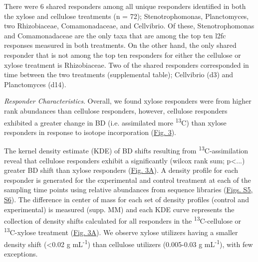 There were 6 shared responders among all unique responders identified in both the xylose and cellulose treatments (n = 72); Stenotrophomonas, Planctomyces, two Rhizobiaceae, Comamonadaceae, and Cellvibrio. Of these, Stenotrophomonas and Comamonadaceae are the only taxa that are among the top ten l2fc responses measured in both treatments. On the other hand, the only shared responder that is not among the top ten responders for either the cellulose or xylose treatment is Rhizobiaceae. Two of the shared responders corresponded in time between the two treatments (supplemental table); Cellvibrio (d3) and Planctomyces (d14).  

\textit{Responder Characteristics}.  Overall, we found xylose responders were from higher rank abundances than cellulose responders, however, cellulose responders exhibited a greater change in BD (i.e. assimilated more \textsuperscript{13}C) than xylose responders in response to isotope incorporation (\href{https://authorea.com/users/3537/articles/3612/master/file/figures/shift_and_rabund2/shift_and_rabund2.png}{Fig. 3}). 

The kernel density estimate (KDE) of BD shifts resulting from \textsuperscript{13}C-assimilation reveal that cellulose responders exhibit a significantly (wilcox rank sum; p\textless...) greater BD shift than xylose responders (\href{https://authorea.com/users/3537/articles/3612/master/file/figures/shift_and_rabund2/shift_and_rabund2.png}{Fig. 3A}). A density profile for each responder is generated for the experimental and control treatment at each of the sampling time points using relative abundances from sequence libraries (\href{https://authorea.com/users/3537/articles/8459/master/file/figures/xylose_resp_profiles/xylose_resp_profiles.png}{Figs. S5}\href{https://authorea.com/users/3537/articles/8459/master/file/figures/cellulose_resp_profiles/cellulose_resp_profiles.png}{, S6}). The difference in center of mass for each set of density profiles (control and experimental) is measured (supp. MM) and each KDE curve represents the collection of density shifts calculated for all responders in the \textsuperscript{13}C-cellulose or \textsuperscript{13}C-xylose treatment (\href{https://authorea.com/users/3537/articles/3612/master/file/figures/shift_and_rabund2/shift_and_rabund2.png}{Fig. 3A}). We observe xylose utilizers having a smaller density shift (\textless0.02 g mL\textsuperscript{-1}) than cellulose utilizers (0.005-0.03 g mL\textsuperscript{-1}), with few exceptions. 

